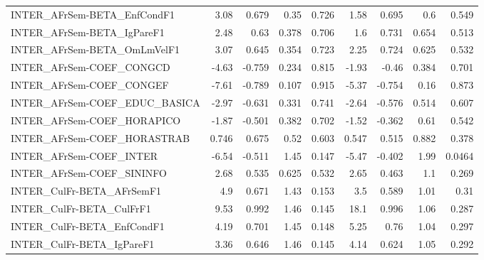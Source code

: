 \begin{tabular}{lrrrrrrrr}
INTER\_AFrSem-BETA\_EnfCondF1           &        3.08 &        0.679 &    0.35 &    0.726 &       1.58 &       0.695 &          0.6 &         0.549 \\
INTER\_AFrSem-BETA\_IgPareF1            &        2.48 &         0.63 &   0.378 &    0.706 &        1.6 &       0.731 &        0.654 &         0.513 \\
INTER\_AFrSem-BETA\_OmLmVelF1           &        3.07 &        0.645 &   0.354 &    0.723 &       2.25 &       0.724 &        0.625 &         0.532 \\
INTER\_AFrSem-COEF\_CONGCD              &       -4.63 &       -0.759 &   0.234 &    0.815 &      -1.93 &       -0.46 &        0.384 &         0.701 \\
INTER\_AFrSem-COEF\_CONGEF              &       -7.61 &       -0.789 &   0.107 &    0.915 &      -5.37 &      -0.754 &         0.16 &         0.873 \\
INTER\_AFrSem-COEF\_EDUC\_BASICA         &       -2.97 &       -0.631 &   0.331 &    0.741 &      -2.64 &      -0.576 &        0.514 &         0.607 \\
INTER\_AFrSem-COEF\_HORAPICO            &       -1.87 &       -0.501 &   0.382 &    0.702 &      -1.52 &      -0.362 &         0.61 &         0.542 \\
INTER\_AFrSem-COEF\_HORASTRAB           &       0.746 &        0.675 &    0.52 &    0.603 &      0.547 &       0.515 &        0.882 &         0.378 \\
INTER\_AFrSem-COEF\_INTER               &       -6.54 &       -0.511 &    1.45 &    0.147 &      -5.47 &      -0.402 &         1.99 &        0.0464 \\
INTER\_AFrSem-COEF\_SININFO             &        2.68 &        0.535 &   0.625 &    0.532 &       2.65 &       0.463 &          1.1 &         0.269 \\
INTER\_CulFr-BETA\_AFrSemF1             &         4.9 &        0.671 &    1.43 &    0.153 &        3.5 &       0.589 &         1.01 &          0.31 \\
INTER\_CulFr-BETA\_CulFrF1              &        9.53 &        0.992 &    1.46 &    0.145 &       18.1 &       0.996 &         1.06 &         0.287 \\
INTER\_CulFr-BETA\_EnfCondF1            &        4.19 &        0.701 &    1.45 &    0.148 &       5.25 &        0.76 &         1.04 &         0.297 \\
INTER\_CulFr-BETA\_IgPareF1             &        3.36 &        0.646 &    1.46 &    0.145 &       4.14 &       0.624 &         1.05 &         0.292 \\

\end{tabular}
